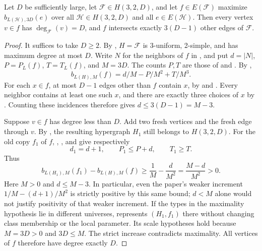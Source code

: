 \begin{lemma}
Let $D$ be sufficiently large, let $\mathcal F\in H(3,2,D)$, and let
$f\in E(\mathcal F)$ maximize
$b_{L(\mathcal H),3D}(e)$ over all $\mathcal H\in H(3,2,D)$ and all
$e\in E(\mathcal H)$.  Then every vertex $v\in f$ has
$\deg_{\mathcal F}(v)=D$, and $f$ intersects exactly $3(D-1)$ other edges of
$\mathcal F$.
\end{lemma}
\begin{proof}
It suffices to take $D\ge2$. By , $H=\mathcal F$
is 3-uniform, 2-simple, and has maximum degree at most $D$. Write $N$
for the neighbors of $f$ in , and put
$d=|N|$, $P=P_L(f)$, $T=T_L(f)$, and $M=3D$.
The counts $P,T$ are those of  and
. By ,
\[
 b_{L(H),M}(f)=d/M-P/M^2+T/M^3.
\]
For each $x\in f$, at most $D-1$ edges other than $f$ contain $x$,
by  and . Every
neighbor contains at least one such $x$, and there are exactly three
choices of $x$ by . Counting these incidences
therefore gives $d\le3(D-1)=M-3$.

Suppose $v\in f$ has degree less than $D$. Add two fresh vertices and
the fresh edge through $v$. By
, the resulting
hypergraph $H_1$ still belongs to $H(3,2,D)$.
For the old copy $f_1$ of $f$,
,
, and
 give respectively
\[
 d_1=d+1,\qquad P_1\le P+d,\qquad T_1\ge T.
\]
Thus
\[
 b_{L(H_1),M}(f_1)-b_{L(H),M}(f)
 \ge \frac1M-\frac d{M^2}=\frac{M-d}{M^2}>0.
\]
Here $M>0$ and $d\le M-3$. In particular, even the paper's weaker
increment $1/M-(d+1)/M^2$ is strictly positive by this same bound;
$d<M$ alone would not justify positivity of that weaker increment.
If the types in the maximality hypothesis lie in different universes,
 represents $(H_1,f_1)$ there
without changing class membership or the local parameter.
Its scale hypotheses hold because $M=3D>0$ and $3D\le M$.
The strict increase contradicts maximality. All vertices of $f$ therefore
have degree exactly $D$.


\end{proof}
